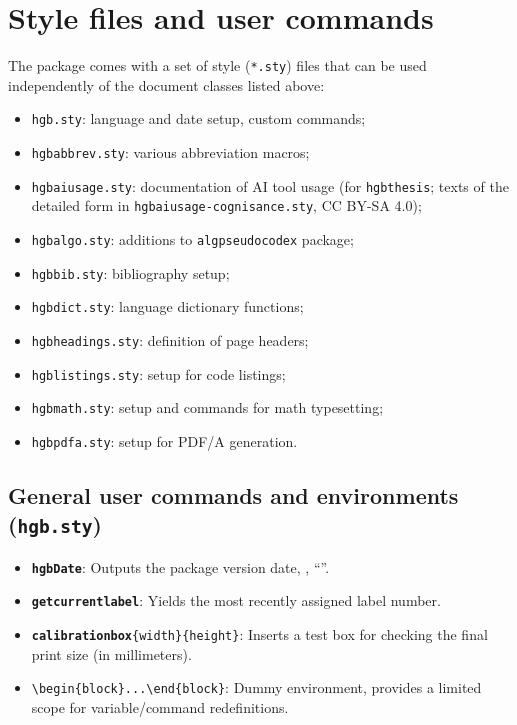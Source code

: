 \documentclass[language=english]{hgbarticle}
\begin{document}
\section{Style files and user commands}

The package comes with a set of style (\texttt{*.sty}) files that can be used
independently of the document classes listed above:
\begin{itemize}
  \item \texttt{hgb.sty}: language and date setup, custom commands;
  \item \texttt{hgbabbrev.sty}: various abbreviation macros;
  \item \texttt{hgbaiusage.sty}: documentation of AI tool usage (for \texttt{hgbthesis}; texts of the
    detailed form in \texttt{hgbaiusage-cognisance.sty}, CC BY-SA 4.0);
  \item \texttt{hgbalgo.sty}: additions to \texttt{algpseudocodex} package;
  \item \texttt{hgbbib.sty}: bibliography setup;
  \item \texttt{hgbdict.sty}: language dictionary functions;
  \item \texttt{hgbheadings.sty}: definition of page headers;
  \item \texttt{hgblistings.sty}: setup for code listings;
  \item \texttt{hgbmath.sty}: setup and commands for math typesetting;
  \item \texttt{hgbpdfa.sty}: setup for PDF/A generation.
\end{itemize}

\subsection{General user commands and environments (\texttt{hgb.sty})}
\label{sec:GeneralUserCommands}

\begin{itemize}
   \item \textbf{\texttt{{\bs}hgbDate}}: Outputs the package version date,
    \eg, ``\texttt{\hgbDate}''.
	\item \textbf{\texttt{{\bs}getcurrentlabel}}:
			Yields the most recently assigned label number.
   \item \textbf{\texttt{{\bs}calibrationbox}}\verb!{width}{height}!:
			Inserts a test box for checking the final print size (in millimeters).
	\item \verb!\begin{block}...\end{block}!:
			Dummy environment, provides a limited scope for variable/command redefinitions.
\end{itemize}
\end{document}
